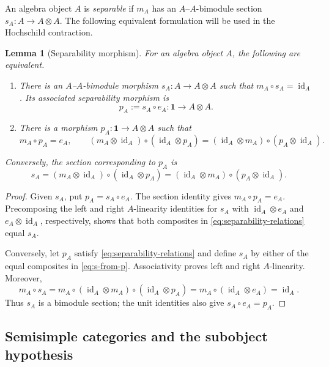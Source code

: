\documentclass[11pt]{amsart}
\newtheorem{lemma}[theorem]{Lemma}
\theoremstyle{definition}
\theoremstyle{remark}
\newcommand{\one}{\mathbf 1}
\DeclareMathOperator{\id}{id}
\begin{document}
An algebra object $A$ is \emph{separable} if $m_A$ has an
$A$--$A$-bimodule section $s_A:A\to A\otimes A$.
The following equivalent formulation will be used in the Hochschild
contraction.

\begin{lemma}[Separability morphism]\label{lem:separability-morphism}
For an algebra object $A$, the following are equivalent.
\begin{enumerate}[label=\textup{(\roman*)}]
 \item There is an $A$--$A$-bimodule morphism
 $s_A:A\to A\otimes A$ such that $m_A\circ s_A=\id_A$.
 Its associated separability morphism is
 \begin{equation}\label{eq:separability-morphism}
  p_A:=s_A\circ e_A:\one\longrightarrow A\otimes A.
 \end{equation}
 \item There is a morphism $p_A:\one\to A\otimes A$ such that
 \begin{equation}\label{eq:separability-relations}
  m_A\circ p_A=e_A,
  \qquad
  (m_A\otimes\id_A)\circ(\id_A\otimes p_A)
  =(\id_A\otimes m_A)\circ(p_A\otimes\id_A).
 \end{equation}
\end{enumerate}
Conversely, the section corresponding to $p_A$ is
\begin{equation}\label{eq:s-from-p}
 s_A=(m_A\otimes\id_A)\circ(\id_A\otimes p_A)
     =(\id_A\otimes m_A)\circ(p_A\otimes\id_A).
\end{equation}
\end{lemma}

\begin{proof}
Given $s_A$, put $p_A=s_A\circ e_A$.  The section identity gives
$m_A\circ p_A=e_A$.  Precomposing the left and right $A$-linearity
identities for $s_A$ with $\id_A\otimes e_A$ and
$e_A\otimes\id_A$, respectively, shows that both composites in
\eqref{eq:separability-relations} equal $s_A$.

Conversely, let $p_A$ satisfy \eqref{eq:separability-relations} and define
$s_A$ by either of the equal composites in
\eqref{eq:s-from-p}.  Associativity proves left and right
$A$-linearity.  Moreover,
\[
 m_A\circ s_A
 =m_A\circ(\id_A\otimes m_A)\circ(\id_A\otimes p_A)
 =m_A\circ(\id_A\otimes e_A)=\id_A.
\]
Thus $s_A$ is a bimodule section; the unit identities also give
$s_A\circ e_A=p_A$.
\end{proof}

\subsection{Semisimple categories and the subobject hypothesis}
\end{document}
